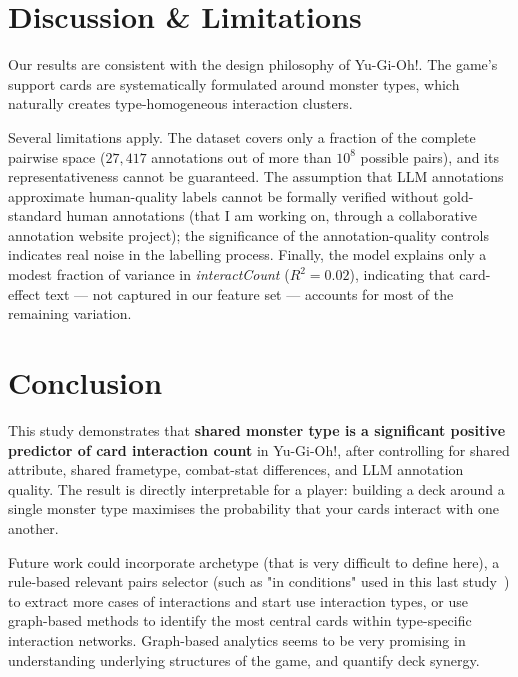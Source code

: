 \documentclass[10pt, a4paper]{article}
\begin{document}
\section{Discussion \& Limitations}

Our results are consistent with the design philosophy of Yu-Gi-Oh!.
The game's support cards are systematically formulated around
monster types, which naturally creates type-homogeneous interaction
clusters.

Several limitations apply. The dataset covers only a fraction of the
complete pairwise space ($27{,}417$ annotations out of more than
$10^{8}$ possible pairs), and its representativeness cannot be
guaranteed. The assumption that LLM annotations approximate
human-quality labels cannot be formally verified without
gold-standard human annotations (that I am working on, through a collaborative annotation website project); 
the significance of the annotation-quality controls indicates real noise in the labelling
process. Finally, the model explains only a modest fraction of
variance in \textit{interactCount} ($R^2 = 0.02$), indicating that
card-effect text --- not captured in our feature set --- accounts
for most of the remaining variation.

\section{Conclusion}

This study demonstrates that \textbf{shared monster type is a
significant positive predictor of card interaction count} in
Yu-Gi-Oh!, after controlling for shared attribute, shared frametype,
combat-stat differences, and LLM annotation quality. The result is
directly interpretable for a player: building a deck around a single
monster type maximises the probability that your cards interact with
one another.

Future work could incorporate archetype (that is very difficult to define here), 
a rule-based relevant pairs selector (such as "in conditions" used in this last study~\cite{ygo_individualism})
to extract more cases of interactions and start use interaction types,
or use graph-based methods to identify the most central cards within
type-specific interaction networks. Graph-based analytics seems to be very promising in understanding underlying structures
of the game, and quantify deck synergy.
\end{document}
